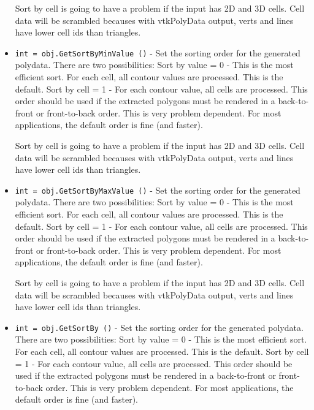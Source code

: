 \begin{itemize}
 Sort by cell is going to have a problem if the input has 2D and 3D cells.
 Cell data will be scrambled becauses with 
 vtkPolyData output, verts and lines have lower cell ids than triangles.

\item  \verb|int = obj.GetSortByMinValue ()| -  Set the sorting order for the generated polydata. There are two
 possibilities:
   Sort by value = 0 - This is the most efficient sort. For each cell,
      all contour values are processed. This is the default.
   Sort by cell = 1 - For each contour value, all cells are processed.
      This order should be used if the extracted polygons must be rendered
      in a back-to-front or front-to-back order. This is very problem 
      dependent.
 For most applications, the default order is fine (and faster).

 Sort by cell is going to have a problem if the input has 2D and 3D cells.
 Cell data will be scrambled becauses with 
 vtkPolyData output, verts and lines have lower cell ids than triangles.

\item  \verb|int = obj.GetSortByMaxValue ()| -  Set the sorting order for the generated polydata. There are two
 possibilities:
   Sort by value = 0 - This is the most efficient sort. For each cell,
      all contour values are processed. This is the default.
   Sort by cell = 1 - For each contour value, all cells are processed.
      This order should be used if the extracted polygons must be rendered
      in a back-to-front or front-to-back order. This is very problem 
      dependent.
 For most applications, the default order is fine (and faster).

 Sort by cell is going to have a problem if the input has 2D and 3D cells.
 Cell data will be scrambled becauses with 
 vtkPolyData output, verts and lines have lower cell ids than triangles.

\item  \verb|int = obj.GetSortBy ()| -  Set the sorting order for the generated polydata. There are two
 possibilities:
   Sort by value = 0 - This is the most efficient sort. For each cell,
      all contour values are processed. This is the default.
   Sort by cell = 1 - For each contour value, all cells are processed.
      This order should be used if the extracted polygons must be rendered
      in a back-to-front or front-to-back order. This is very problem 
      dependent.
 For most applications, the default order is fine (and faster).


\end{itemize}
